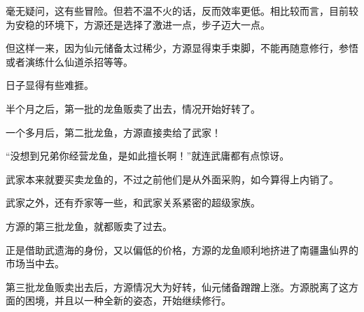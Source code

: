 \begin{this_body}
毫无疑问，这有些冒险。但若不温不火的话，反而效率更低。相比较而言，目前较为安稳的环境下，方源还是选择了激进一点，步子迈大一点。

但这样一来，因为仙元储备太过稀少，方源显得束手束脚，不能再随意修行，参悟或者演练什么仙道杀招等等。

日子显得有些难捱。

半个月之后，第一批的龙鱼贩卖了出去，情况开始好转了。

一个多月后，第二批龙鱼，方源直接卖给了武家！

“没想到兄弟你经营龙鱼，是如此擅长啊！”就连武庸都有点惊讶。

武家本来就要买卖龙鱼的，不过之前他们是从外面采购，如今算得上内销了。

武家之外，还有乔家等一些，和武家关系紧密的超级家族。

方源的第三批龙鱼，就都贩卖了过去。

正是借助武遗海的身份，又以偏低的价格，方源的龙鱼顺利地挤进了南疆蛊仙界的市场当中去。

第三批龙鱼贩卖出去后，方源情况大为好转，仙元储备蹭蹭上涨。方源脱离了这方面的困境，并且以一种全新的姿态，开始继续修行。

\end{this_body}

